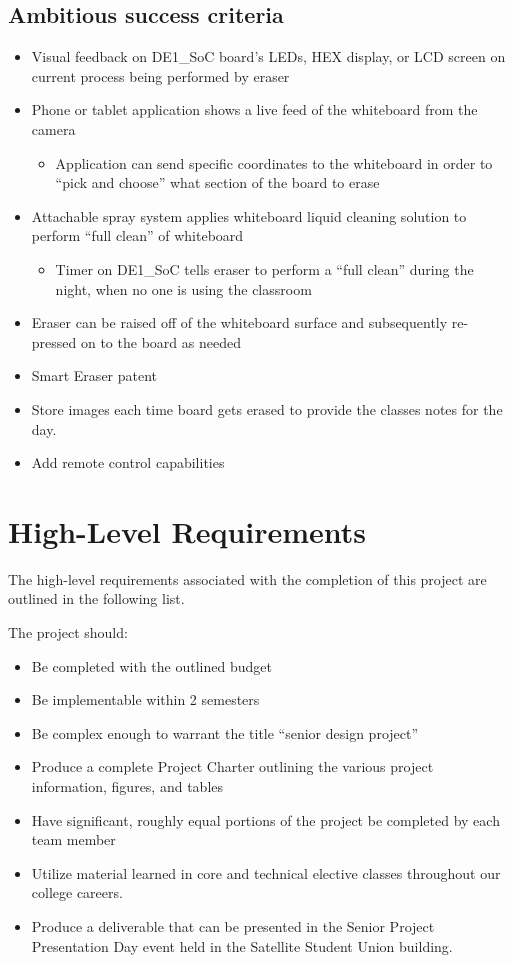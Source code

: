 \subsection{Ambitious success criteria}
\begin{itemize}
\item Visual feedback on DE1\_SoC board's LEDs, HEX display, or LCD screen on current process being performed by eraser
\item Phone or tablet application shows a live feed of the whiteboard from the camera
\begin{itemize}
\item Application can send specific coordinates to the whiteboard in order to ``pick and choose'' what section of the board to erase
\end{itemize}
\item Attachable spray system applies whiteboard liquid cleaning solution to perform ``full clean'' of whiteboard
\begin{itemize}
\item Timer on DE1\_SoC tells eraser to perform a ``full clean'' during the night, when no one is using the classroom
\end{itemize}
\item Eraser can be raised off of the whiteboard surface and subsequently re-pressed on to the board as needed
\item Smart Eraser patent
\item Store images each time board gets erased to provide the classes notes for the day.
\item Add remote control capabilities 
\end{itemize}
 
 
 \section{High-Level Requirements}
The high-level requirements associated with the completion of this project are outlined in the following list. \par
\setlength{\parindent}{2.5ex} The project should:
\begin{itemize}
\item Be completed with the outlined budget
\item Be implementable within 2 semesters
\item Be complex enough to warrant the title ``senior design project''
\item Produce a complete Project Charter outlining the various project information, figures, and tables
\item Have significant, roughly equal portions of the project be completed by each team member
\item Utilize material learned in core and technical elective classes throughout our college careers.
\item Produce a deliverable that can be presented in the Senior Project Presentation Day event held in the Satellite Student Union building.
\end{itemize}
 
